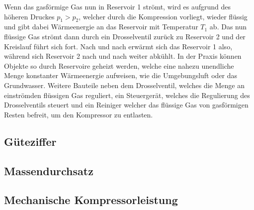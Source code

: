 Wenn das gasförmige Gas nun in Reservoir 1 strömt, wird es aufgrund des höheren Druckes $p_1 > p_2$, welcher durch die Kompression vorliegt, wieder flüssig und gibt dabei Wärmeenergie an das Reservoir mit Temperatur $T_1$ ab. Das nun flüssige Gas strömt dann durch ein Drosselventil zurück zu Reservoir 2 und der Kreislauf führt sich fort.
Nach und nach erwärmt sich das Reservoir 1 also, während sich Reservoir 2 nach und nach weiter abkühlt.
In der Praxis können Objekte so durch Reservoire geheizt werden, welche eine nahezu unendliche Menge konstanter Wärmeenergie aufweisen, wie die Umgebungsluft oder das Grundwasser.
Weitere Bauteile neben dem Drosselventil, welches die Menge an einströmden flüssigen Gas reguliert, ein Steuergerät, welches die Regulierung des Drosselventils steuert und ein Reiniger welcher das flüssige Gas von gasförmigen Resten befreit, um den Kompressor zu entlasten.
\subsection{Güteziffer}
\subsection{Massendurchsatz}
\subsection{Mechanische Kompressorleistung}